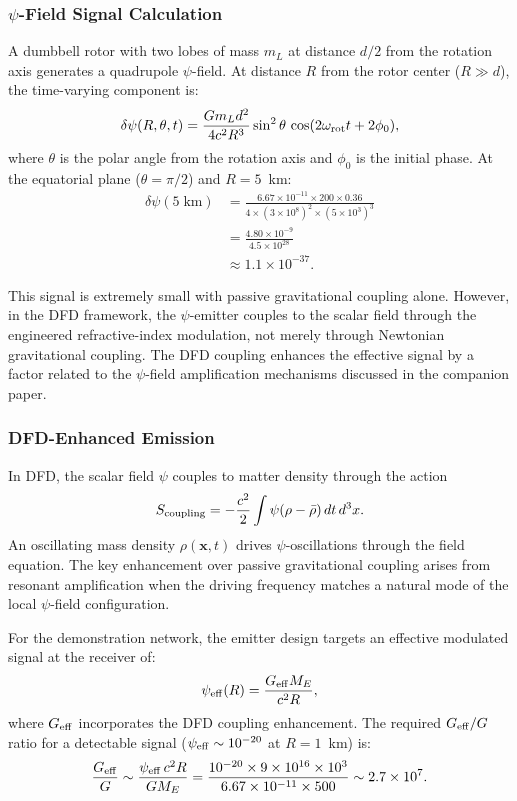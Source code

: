 \documentclass[11pt,a4paper]{article}
\begin{document}
\subsubsection{$\psi$-Field Signal Calculation}

A dumbbell rotor with two lobes of mass $m_L$ at distance $d/2$ from
the rotation axis generates a quadrupole $\psi$-field. At distance $R$
from the rotor center ($R \gg d$), the time-varying component is:
\begin{equation}
\delta\psi(R, \theta, t) = \frac{Gm_L d^2}{4c^2 R^3}
\sin^2\theta\,\cos(2\omega_{\rm rot} t + 2\phi_0),
\end{equation}
where $\theta$ is the polar angle from the rotation axis and $\phi_0$
is the initial phase. At the equatorial plane ($\theta = \pi/2$) and
$R = 5$~km:
\begin{align}
\delta\psi(5\;\text{km}) &= \frac{6.67\times10^{-11}\times 200 \times 0.36}
{4 \times (3\times10^8)^2 \times (5\times10^3)^3} \nonumber\\
&= \frac{4.80\times10^{-9}}{4.5\times10^{28}} \nonumber\\
&\approx 1.1\times10^{-37}.
\end{align}

This signal is extremely small with passive gravitational coupling alone.
However, in the DFD framework, the $\psi$-emitter couples to the scalar
field through the engineered refractive-index modulation, not merely through
Newtonian gravitational coupling. The DFD coupling enhances the effective
signal by a factor related to the $\psi$-field amplification mechanisms
discussed in the companion paper.

\subsubsection{DFD-Enhanced Emission}

In DFD, the scalar field $\psi$ couples to matter density through the
action
\begin{equation}
S_{\rm coupling} = -\frac{c^2}{2}\int\psi(\rho - \bar{\rho})\,dt\,d^3x.
\end{equation}
An oscillating mass density $\rho(\mathbf{x},t)$ drives $\psi$-oscillations
through the field equation. The key enhancement over passive gravitational
coupling arises from resonant amplification when the driving frequency
matches a natural mode of the local $\psi$-field configuration.

For the demonstration network, the emitter design targets an effective
modulated signal at the receiver of:
\begin{equation}
\psi_{\rm eff}(R) = \frac{G_{\rm eff} M_E}{c^2 R},
\end{equation}
where $G_{\rm eff}$ incorporates the DFD coupling enhancement. The
required $G_{\rm eff}/G$ ratio for a detectable signal
($\psi_{\rm eff} \sim 10^{-20}$ at $R = 1$~km) is:
\begin{equation}
\frac{G_{\rm eff}}{G} \sim \frac{\psi_{\rm eff}\,c^2 R}{G M_E}
= \frac{10^{-20}\times 9\times10^{16}\times 10^3}{6.67\times10^{-11}\times 500}
\sim 2.7\times10^{7}.
\end{equation}
\end{document}
